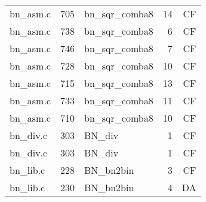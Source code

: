 \begin{table}
\begin{tabular}{lrlrr}
bn\_asm.c& 705&bn\_sqr\_comba8&14&CF\\
bn\_asm.c& 738&bn\_sqr\_comba8&6 &CF\\
bn\_asm.c& 746&bn\_sqr\_comba8&7 &CF\\
bn\_asm.c& 728&bn\_sqr\_comba8&10&CF\\
bn\_asm.c& 715&bn\_sqr\_comba8&13&CF\\
bn\_asm.c& 733&bn\_sqr\_comba8&11&CF\\
bn\_asm.c& 710&bn\_sqr\_comba8&10&CF\\
bn\_div.c& 303&BN\_div&1 &CF\\
bn\_div.c& 303&BN\_div&1 &CF\\
bn\_lib.c& 228&BN\_bn2bin&3 &CF\\
bn\_lib.c& 230&BN\_bn2bin&4 &DA\\
\hline
\end{tabular}
\end{table}
